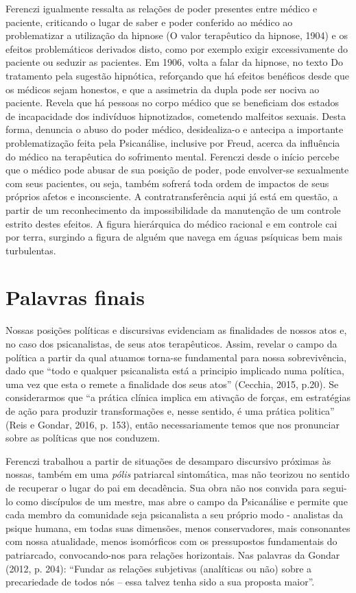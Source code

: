 Ferenczi igualmente ressalta as relações de poder presentes entre médico
e paciente, criticando o lugar de saber e poder conferido ao médico ao
problematizar a utilização da hipnose (O valor terapêutico da hipnose,
1904) e os efeitos problemáticos derivados disto, como por exemplo
exigir excessivamente do paciente ou seduzir as pacientes. Em 1906,
volta a falar da hipnose, no texto Do tratamento pela sugestão
hipnótica, reforçando que há efeitos benéficos desde que os médicos
sejam honestos, e que a assimetria da dupla pode ser nociva ao paciente.
Revela que há pessoas no corpo médico que se beneficiam dos estados de
incapacidade dos indivíduos hipnotizados, cometendo malfeitos sexuais.
Desta forma, denuncia o abuso do poder médico, desidealiza-o e antecipa
a importante problematização feita pela Psicanálise, inclusive por
Freud, acerca da influência do médico na terapêutica do sofrimento
mental. Ferenczi desde o início percebe que o médico pode abusar de sua
posição de poder, pode envolver-se sexualmente com seus pacientes, ou
seja, também sofrerá toda ordem de impactos de seus próprios afetos e
inconsciente. A contratransferência aqui já está em questão, a partir de
um reconhecimento da impossibilidade da manutenção de um controle
estrito destes efeitos. A figura hierárquica do médico racional e em
controle cai por terra, surgindo a figura de alguém que navega em águas
psíquicas bem mais turbulentas.

\section{Palavras finais}

Nossas posições políticas e discursivas evidenciam as finalidades de
nossos atos e, no caso dos psicanalistas, de seus atos terapêuticos.
Assim, revelar o campo da política a partir da qual atuamos torna-se
fundamental para nossa sobrevivência, dado que ``todo e qualquer
psicanalista está a principio implicado numa política, uma vez que esta
o remete a finalidade dos seus atos'' (Cecchia, 2015, p.20). Se
considerarmos que ``a prática clínica implica em ativação de forças, em
estratégias de ação para produzir transformações e, nesse sentido, é uma
prática politica'' (Reis e Gondar, 2016, p. 153), então necessariamente
temos que nos pronunciar sobre as políticas que nos conduzem.

Ferenczi trabalhou a partir de situações de desamparo discursivo
próximas às nossas, também em uma \emph{pólis} patriarcal sintomática,
mas não teorizou no sentido de recuperar o lugar do pai em decadência.
Sua obra não nos convida para segui-lo como discípulos de um mestre, mas
abre o campo da Psicanálise e permite que cada membro da comunidade seja
psicanalista a seu próprio modo - analistas da psique humana, em todas
suas dimensões, menos conservadores, mais consonantes com nossa
atualidade, menos isomórficos com os pressupostos fundamentais do
patriarcado, convocando-nos para relações horizontais. Nas palavras da
Gondar (2012, p. 204): ``Fundar as relações subjetivas (analíticas ou
não) sobre a precariedade de todos nós -- essa talvez tenha sido a sua
proposta maior''.

